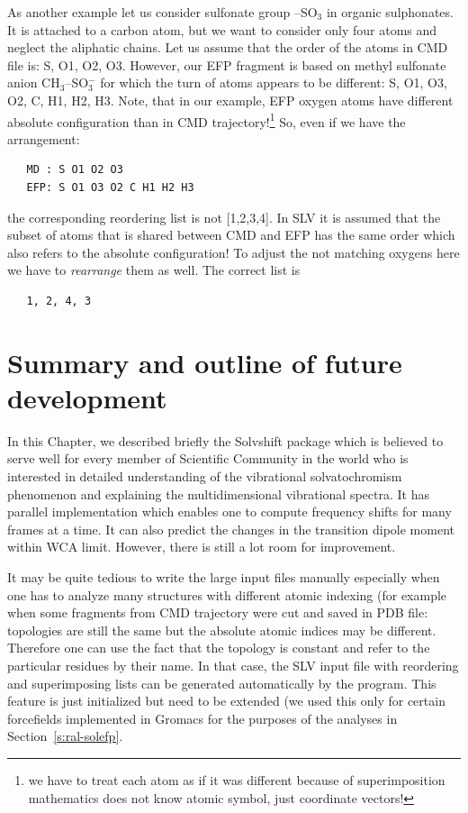 \documentclass[a4paper,titlepage,twoside,fleqn,12pt]{book}
\begin{document}
\begin{refsection}
As another example let us consider sulfonate group --SO$_3$
in organic sulphonates. It is attached to a carbon atom, but we want to consider only four atoms
and neglect the aliphatic chains. 
Let us assume that the order of the atoms in CMD file is: 
S, O1, O2, O3. However, our EFP fragment is based on methyl sulfonate anion CH$_3$--SO$_3^-$
for which the turn of atoms appears to be different: S, O1, O3, O2, C, H1, H2, H3. Note, that in our
example, EFP oxygen atoms have different absolute configuration than in CMD trajectory!\footnote{we have to treat
each atom as if it was different because of superimposition mathematics does not know atomic symbol,
just coordinate vectors!} So, even if we have the arrangement:
%
\begin{verbatim}
   MD : S O1 O2 O3
   EFP: S O1 O3 O2 C H1 H2 H3
\end{verbatim}
%
the corresponding reordering list is not [1,2,3,4]. In SLV it is assumed
that the subset of atoms that is shared between CMD and EFP has the same order which also refers to the
absolute configuration! To adjust the not matching oxygens here we have to \emph{rearrange}
them as well. The correct list is
%
\begin{verbatim}
   1, 2, 4, 3
\end{verbatim}
%


\section{Summary and outline of future development}

In this Chapter, we described briefly the {\sc Solvshift} package
which is believed to serve well for every member of Scientific Community
in the world who is interested in detailed understanding of the
vibrational solvatochromism phenomenon and explaining
the multidimensional vibrational spectra. It has parallel 
implementation which enables one to compute frequency shifts
for many frames at a time. It can also predict the changes in the
transition dipole moment within WCA limit. However, there is still a lot room for improvement.

It may be quite tedious to write the large input files manually especially when one has to analyze many
structures with different atomic indexing (for example when some fragments from CMD trajectory were
cut and saved in PDB file: topologies are still the same but the absolute atomic indices may be different.
Therefore one can use the fact that the topology is constant and refer to the particular residues by their
name. In that case, the SLV input file with reordering and superimposing lists can be generated
automatically by the program. This feature is just initialized but need to be extended (we used
this only for certain forcefields implemented in {\sc Gromacs} for the purposes
of the analyses in Section~\ref{s:ral-solefp}.


\end{refsection}
\end{document}
